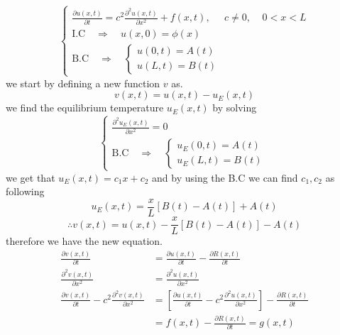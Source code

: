 \documentclass[]{article}
\begin{document}
\begin{equation}
    \begin{cases}
        \displaystyle \frac{\partial u(x,t)}{\partial t} = c^2 \frac{\partial^2 u(x,t)}{\partial x^2} + f(x,t), \;\;\;\;\; c\neq 0, \;\;\;\; 0<x<L
        \\
        \text{I.C} \quad \Longrightarrow \quad u(x,0) = \phi(x)
        \\
        \text{B.C} \quad \Longrightarrow \quad
        \begin{cases}
            u(0,t) = A(t)
            \\
            u(L,t) = B(t)        
        \end{cases}  
    \end{cases}
\end{equation}
we start by defining a new function $v$ as.
\[
v(x,t) = u(x,t) - u_E(x,t)    
\]
we find the equilibrium temperature $u_E(x,t)$ by solving 
\begin{equation}
    \begin{cases}
        \displaystyle \frac{\partial^2 u_E(x,t)}{\partial x^2}  = 0
        \\
        \text{B.C} \quad \Longrightarrow \quad
            \begin{cases}
                u_E(0,t) = A(t)
                \\
                u_E(L,t) = B(t)        
            \end{cases} 
    \end{cases}
\end{equation}
we get that $u_E(x,t) = c_1 x + c_2$ and by using the B.C we can find $c_1,c_2$ as following
\[
u_E(x,t) = \frac{x}{L}[B(t)-A(t)] +A(t)    
\]
\begin{equation}
\therefore v(x,t) = u(x,t) -  \frac{x}{L}[B(t)-A(t)] -A(t)
\end{equation}
therefore we have the new equation.
\begin{align*}
\frac{\partial v(x,t)}{\partial t} &= \frac{\partial u(x,t)}{\partial t} - \frac{\partial R(x,t)}{\partial t}
\\
\frac{\partial^2 v(x,t)}{\partial x^2} &= \frac{\partial^2 u(x,t)}{\partial x^2}
\\
\frac{\partial v(x,t)}{\partial t} - c^2 \frac{\partial^2 v(x,t)}{\partial x^2} &= \left[ \frac{\partial u(x,t)}{\partial t} - c^2 \frac{\partial^2 u(x,t)}{\partial x^2}\right] - \frac{\partial R(x,t)}{\partial t}
\\
&= f(x,t) - \frac{\partial R(x,t)}{\partial t} = g(x,t)
\end{align*}
\end{document}

